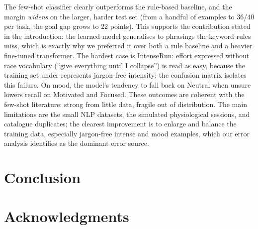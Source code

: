 \documentclass[11pt,a4paper]{article}
\begin{document}
	The few-shot classifier clearly outperforms the rule-based baseline, and the margin \emph{widens} on the larger, harder test set (from a handful of examples to $36$/$40$ per task, the goal gap grows to $22$ points). This supports the contribution stated in the introduction: the learned model generalises to phrasings the keyword rules miss, which is exactly why we preferred it over both a rule baseline and a heavier fine-tuned transformer. The hardest case is IntenseRun: effort expressed without race vocabulary (``give everything until I collapse'') is read as easy, because the training set under-represents jargon-free intensity; the confusion matrix isolates this failure. On mood, the model's tendency to fall back on Neutral when unsure lowers recall on Motivated and Focused. These outcomes are coherent with the few-shot literature: strong from little data, fragile out of distribution. The main limitations are the small NLP datasets, the simulated physiological sessions, and catalogue duplicates; the clearest improvement is to enlarge and balance the training data, especially jargon-free intense and mood examples, which our error analysis identifies as the dominant error source.

	\section{Conclusion}


	\section*{Acknowledgments}

\end{document}
